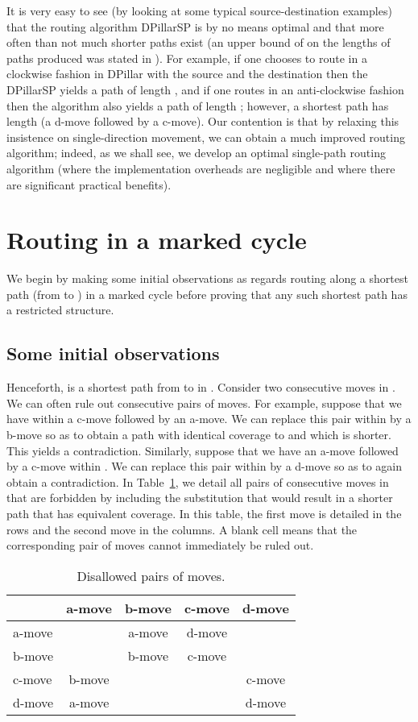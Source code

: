\documentclass{article}
\begin{document}
It is very easy to see (by looking at some typical source-destination examples) that the routing algorithm DPillarSP is by no means optimal and that more often than not much shorter paths exist (an upper bound of  on the lengths of paths produced was stated in \cite{LYY12}). For example, if one chooses to route in a clockwise fashion in DPillar with the source  and the destination  then the DPillarSP yields a path of length , and if one routes in an anti-clockwise fashion then the algorithm also yields a path of length ; however, a shortest path has length  (a d-move followed by a c-move). Our contention is that by relaxing this insistence on single-direction movement, we can obtain a much improved routing algorithm; indeed, as we shall see, we develop an optimal single-path routing algorithm (where the implementation overheads are negligible and where there are significant practical benefits).

\section{Routing in a marked cycle}\label{sec:routingmarked}

We begin by making some initial observations as regards routing along a shortest path (from  to ) in a marked cycle  before proving that any such shortest path has a restricted structure.

\subsection{Some initial observations}

Henceforth,  is a shortest path from  to  in . Consider two consecutive moves in . We can often rule out consecutive pairs of moves. For example, suppose that we have within  a c-move followed by an a-move. We can replace this pair within  by a b-move so as to obtain a path with identical coverage to  and which is shorter. This yields a contradiction. Similarly, suppose that we have an a-move followed by a c-move within . We can replace this pair within  by a d-move so as to again obtain a contradiction. In Table~\ref{tablemoves}, we detail all pairs of consecutive moves in  that are forbidden by including the substitution that would result in a shorter path that has equivalent coverage. In this table, the first move is detailed in the rows and the second move in the columns. A blank cell means that the corresponding pair of moves cannot immediately be ruled out.

\begin{table}[ht]
\caption{Disallowed pairs of moves.}
\centering
\begin{tabular}{|l | c | c | c | c|}
\hline
& a-move & b-move & c-move & d-move\\
\hline
a-move &  & a-move & d-move &  \\
b-move &  & b-move & c-move &  \\
c-move & b-move &  &  & c-move \\
d-move & a-move &  &  & d-move \\
\hline
\end{tabular}
\label{tablemoves}
\end{table}
\end{document}
